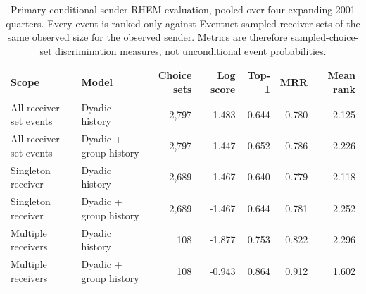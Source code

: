 \begin{table}[t]
\centering
\caption{Primary conditional-sender RHEM evaluation, pooled over four expanding 2001 quarters. Every event is ranked only against Eventnet-sampled receiver sets of the same observed size for the observed sender. Metrics are therefore sampled-choice-set discrimination measures, not unconditional event probabilities.}
\label{tab:primary-rhem}
\small
\begin{tabular}{llrrrrr}
\toprule
Scope & Model & Choice sets & Log score & Top-1 & MRR & Mean rank \\
\midrule
All receiver-set events & Dyadic history & 2,797 & -1.483 & 0.644 & 0.780 & 2.125 \\
All receiver-set events & Dyadic + group history & 2,797 & -1.447 & 0.652 & 0.786 & 2.226 \\
Singleton receiver & Dyadic history & 2,689 & -1.467 & 0.640 & 0.779 & 2.118 \\
Singleton receiver & Dyadic + group history & 2,689 & -1.467 & 0.644 & 0.781 & 2.252 \\
Multiple receivers & Dyadic history & 108 & -1.877 & 0.753 & 0.822 & 2.296 \\
Multiple receivers & Dyadic + group history & 108 & -0.943 & 0.864 & 0.912 & 1.602 \\
\bottomrule
\end{tabular}
\end{table}
